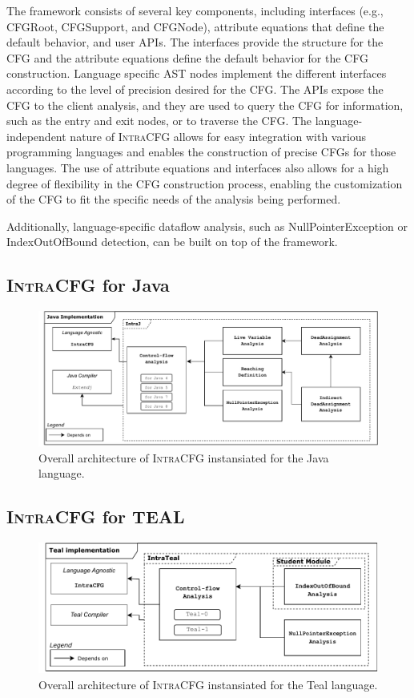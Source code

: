 The framework consists of several key components, including interfaces
(e.g., CFGRoot, CFGSupport, and CFGNode), attribute equations that define the
default behavior, and user APIs. The interfaces provide the structure for the
CFG and the attribute equations define the default behavior for the CFG
construction. Language specific AST nodes implement the different interfaces 
according to the level of precision desired for the CFG.
The APIs expose the CFG to the client analysis, and they are used to query the CFG
for information, such as the entry and exit nodes, or to traverse the CFG.
The language-independent nature of \textsc{IntraCFG} allows for easy integration 
with various programming languages and enables the construction of precise CFGs 
for those languages. The use of attribute equations and interfaces also allows 
for a high degree of flexibility in the CFG construction process, 
enabling the customization of the CFG to fit the specific needs of the 
analysis being performed.

Additionally, language-specific dataflow analysis, such as NullPointerException or
IndexOutOfBound detection, can be built on top of the framework.
\subsection{\textsc{IntraCFG} for Java}
\begin{figure}[H]
	\centering
	\includegraphics[scale=0.5]{kappa/img/architecturejava.pdf}
	\caption{\label{fig:intraJ} Overall architecture of \textsc{IntraCFG} instansiated for the Java language.}
\end{figure}

\subsection{\textsc{IntraCFG} for TEAL}
\begin{figure}[H]
	\centering
	\includegraphics[scale=0.65]{kappa/img/architectureteal.pdf}
	\caption{\label{fig:IntraTeal} Overall architecture of \textsc{IntraCFG} instansiated for the Teal language.}
\end{figure}
